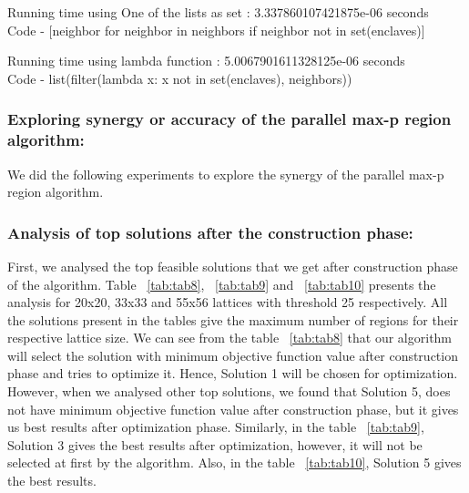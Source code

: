 \documentclass[conference]{IEEEtran}
\begin{document}
Running time using One of the lists as set : 3.337860107421875e-06 seconds\\
Code - [neighbor for neighbor in neighbors if neighbor not in set(enclaves)]

Running time using lambda function : 5.0067901611328125e-06 seconds\\
Code - list(filter(lambda x: x not in set(enclaves), neighbors))

\subsubsection{Exploring synergy or accuracy of the parallel max-p region algorithm:}

We did the following experiments to explore the synergy of the parallel max-p region algorithm. 

\subsubsection*{Analysis of top solutions after the construction phase:}
First, we analysed the top feasible solutions that we get after construction phase of the algorithm. Table ~\ref{tab:tab8}, ~\ref{tab:tab9} and ~\ref{tab:tab10} presents the analysis for 20x20, 33x33 and 55x56 lattices with threshold 25 respectively. All the solutions present in the tables give the maximum number of regions for their respective lattice size. We can see from the table ~\ref{tab:tab8} that our algorithm will select the solution with minimum objective function value after construction phase and tries to optimize it. Hence, Solution 1 will be chosen for optimization. However, when we analysed other top solutions, we found that Solution 5, does not have minimum objective function value after construction phase, but it gives us best results after optimization phase. Similarly, in the table ~\ref{tab:tab9}, Solution 3 gives the best results after optimization, however, it will not be selected at first by the algorithm. Also, in the table ~\ref{tab:tab10}, Solution 5 gives the best results.
\end{document}

